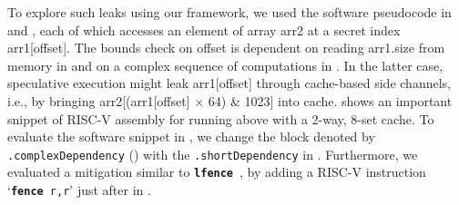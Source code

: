 To explore such leaks using our framework, we used the software
pseudocode in  and
, each of which accesses an element
of array arr2 at a secret index arr1[offset].  The bounds check on
offset is dependent on reading arr1.size from memory in
 and on a complex sequence of
computations in .  In the latter
case, speculative execution might leak arr1[offset] through
cache-based side channels, i.e., by bringing arr2[(arr1[offset]
  $\times$ 64) \& 1023] into cache.
 shows an important snippet of
RISC-V assembly for  running above
\boom with a 2-way, 8-set cache. To evaluate the software snippet in
, we change the block denoted by
\texttt{.complexDependency}
() with
the \texttt{.shortDependency} in .
Furthermore, we evaluated a mitigation similar to
\texttt{\textbf{lfence}}~\cite{intelSpectre}, by adding a RISC-V
instruction `\texttt{\textbf{fence} r,r}' just after
 in .

